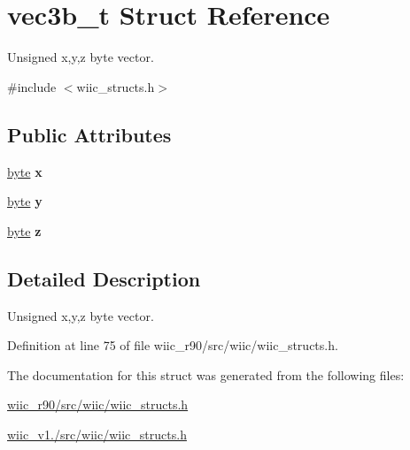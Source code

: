 \hypertarget{structvec3b__t}{\section{vec3b\-\_\-t Struct Reference}
\label{structvec3b__t}
}


Unsigned x,y,z byte vector.  




{\ttfamily \#include $<$wiic\-\_\-structs.\-h$>$}

\subsection*{Public Attributes}
\begin{DoxyCompactItemize}
\item 
\hypertarget{structvec3b__t_a5295b93ff596c418bdb337dff3eb7a64}{\hyperlink{wiic__r90_2src_2wiic_2wiic__macros_8h_a0c8186d9b9b7880309c27230bbb5e69d}{byte} {\bfseries x}}\label{structvec3b__t_a5295b93ff596c418bdb337dff3eb7a64}

\item 
\hypertarget{structvec3b__t_a0536602fe878b4451f453b640b08c6cc}{\hyperlink{wiic__r90_2src_2wiic_2wiic__macros_8h_a0c8186d9b9b7880309c27230bbb5e69d}{byte} {\bfseries y}}\label{structvec3b__t_a0536602fe878b4451f453b640b08c6cc}

\item 
\hypertarget{structvec3b__t_a1d1d231306c68e30c41fb0340e78d603}{\hyperlink{wiic__r90_2src_2wiic_2wiic__macros_8h_a0c8186d9b9b7880309c27230bbb5e69d}{byte} {\bfseries z}}\label{structvec3b__t_a1d1d231306c68e30c41fb0340e78d603}

\end{DoxyCompactItemize}


\subsection{Detailed Description}
Unsigned x,y,z byte vector. 

Definition at line 75 of file wiic\-\_\-r90/src/wiic/wiic\-\_\-structs.\-h.



The documentation for this struct was generated from the following files\-:\begin{DoxyCompactItemize}
\item 
\hyperlink{wiic__r90_2src_2wiic_2wiic__structs_8h}{wiic\-\_\-r90/src/wiic/wiic\-\_\-structs.\-h}\item 
\hyperlink{wiic__v1_81_2src_2wiic_2wiic__structs_8h}{wiic\-\_\-v1./src/wiic/wiic\-\_\-structs.\-h}\end{DoxyCompactItemize}
